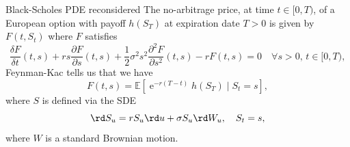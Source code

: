 \documentclass[pdf, handout]{beamer}
\newcommand{\e}{\operatorname{e}}
\begin{document}
\begin{frame}{Black-Scholes PDE reconsidered}
The no-arbitrage price, at time $t\in [0,T)$, of a European option with payoff $h(S_T)$ at expiration date $T>0$ is given by
$F(t, S_t)$ where $F$ satisfies
\[
\frac{\delta F}{\delta t}(t,s) + r s \frac{\partial F}{\partial
s}(t,s) + \frac{1}{2}\sigma^2 s^2 \frac{\partial^2 F}{\partial
s^2}(t,s) -r F(t,s)=0\quad \forall s>0,\,t\in[0, T),
\]
Feynman-Kac tells us that we have
\[
F(t, s)= \mathbb{E}\left[ \e^{-r(T-t)}
 h( S_T)
\mid S_t=s
\right],
\]
where $S$ is defined via the SDE
\[
\rd S_u = r S_u \rd u + \sigma S_u \rd W_u, \quad S_t=s,
\]
where $W$ is a standard Brownian motion.
\end{frame}
\end{document}
